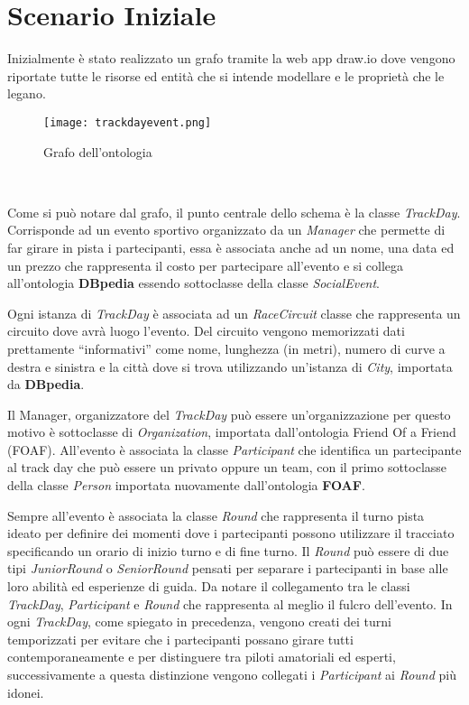 \chapter{Scenario Iniziale}
Inizialmente è stato realizzato un grafo tramite la web app draw.io dove vengono riportate tutte le risorse ed entità che si intende modellare e le proprietà che le legano.
\begin{figure}[h]
	\centering
	\texttt{[image: trackdayevent.png]}
	\caption{Grafo dell'ontologia}
\end{figure}
\\\par
Come si può notare dal grafo, il punto centrale dello schema è la classe \textit{TrackDay}. Corrisponde ad un evento sportivo organizzato da un \textit{Manager} che permette di far girare in pista i partecipanti, essa è associata anche ad un nome, una data ed un prezzo che rappresenta il costo per partecipare all’evento e si collega all’ontologia \textbf{DBpedia} essendo sottoclasse della classe \textit{SocialEvent}. 
\\\par
Ogni istanza di \textit{TrackDay} è associata ad un \textit{RaceCircuit} classe che rappresenta un circuito dove avrà luogo l’evento. Del circuito vengono memorizzati dati prettamente “informativi” come nome, lunghezza (in metri), numero di curve a destra e sinistra e la città dove si trova utilizzando un'istanza di \textit{City}, importata da \textbf{DBpedia}. 
\\\par
Il Manager, organizzatore del \textit{TrackDay} può essere un'organizzazione per questo motivo è sottoclasse di \textit{Organization}, importata dall’ontologia Friend Of a Friend (FOAF). All'evento è associata la classe \textit{Participant} che identifica un partecipante al track day che può essere un privato oppure un team, con il primo sottoclasse della classe \textit{Person} importata nuovamente dall'ontologia \textbf{FOAF}. 
\\\par
Sempre all'evento è associata la classe \textit{Round} che rappresenta il turno pista ideato per definire dei momenti dove i partecipanti possono utilizzare il tracciato specificando un orario di inizio turno e di fine turno. Il \textit{Round} può essere di due tipi \textit{JuniorRound} o \textit{SeniorRound} pensati per separare i partecipanti in base alle loro abilità ed esperienze di guida. Da notare il collegamento tra le classi \textit{TrackDay}, \textit{Participant} e \textit{Round} che rappresenta al meglio il fulcro dell'evento. In ogni \textit{TrackDay}, come spiegato in precedenza, vengono creati dei turni temporizzati per evitare che i partecipanti possano girare tutti contemporaneamente e per distinguere tra piloti amatoriali ed esperti, successivamente a questa distinzione vengono collegati i \textit{Participant} ai \textit{Round} più idonei. 
